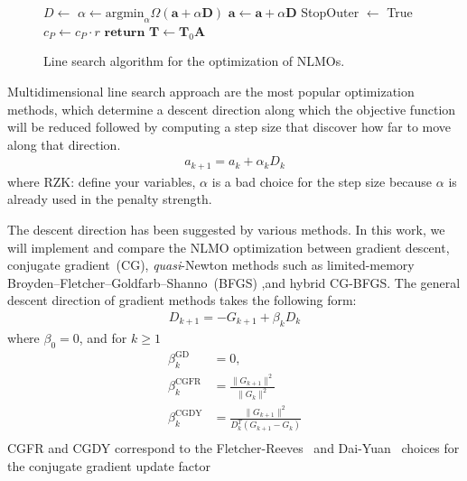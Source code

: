 \documentclass[aps,prl,reprint,amsmath,amssymb]{revtex4-1}
\begin{document}
\begin{figure}
\begin{algorithm}[H]
\begin{algorithmic}[1]
				\State $D \gets $  
				\State $\alpha \gets \text{argmin}_{\alpha} \Omega(\mathbf{a} + \alpha \mathbf{D})$ 
				\State $\mathbf{a}\gets \mathbf{a} + \alpha \mathbf{D}$ 
			\EndIf
			\State StopOuter $\gets$ True
		\EndIf
			\State $c_{P} \gets c_P \cdot r$ 
		\EndIf
	\State $\mathbf{return}$ $\mathbf{T} \gets \mathbf{T}_0 \mathbf{A} $ 
   \end{algorithmic}
\end{algorithm}
\caption{\label{fig:cg} Line search algorithm for the optimization of NLMOs.}
\end{figure}

Multidimensional line search approach are the most popular optimization methods, which determine a descent direction along which the objective function will be reduced followed by computing a step size that discover how far to move along that direction.
%
\begin{equation} \label{eq:LS_methods}
\begin{split} 
a_{k+1} = a_{k} + \alpha_{k}D_{k}
\end{split}
\end{equation}
%
where RZK: define your variables, $\alpha$ is a bad choice for the step size because $\alpha$ is already used in the penalty strength.

The descent direction has been suggested by various methods. In this work, we will implement and compare the NLMO optimization between gradient descent, conjugate gradient~(CG),  \emph{quasi}-Newton methods such as limited-memory Broyden–Fletcher–Goldfarb–Shanno~(BFGS) ,and hybrid CG-BFGS. The general descent direction of gradient methods takes the following form:
%
\begin{equation} \label{eq:descent_dir}
\begin{split}
D_{k+1} = -G_{k+1} + \beta_k D_{k}
\end{split}
\end{equation}
%
where  $\beta_0=0$, and for $k \geq 1$
\begin{equation} \label{eq:beta}
\begin{split}
\beta_{k}^\text{GD} &= 0, \\
\beta_{k}^\text{CGFR} &= \frac{\lVert{G_{k+1}}\rVert^2}{\lVert{G_{k}}\rVert^2} \\
\beta_{k}^\text{CGDY} &=  \frac{\lVert{G_{k+1}}\rVert^2}{D_{k}^{T}(G_{k+1}-G_{k})} \\
\end{split}
\end{equation}
%
CGFR and CGDY correspond to the Fletcher-Reeves~\citep{fletcher1964function}  and Dai-Yuan~\cite{dai1999nonlinear} choices for the conjugate gradient update factor
\end{document}

